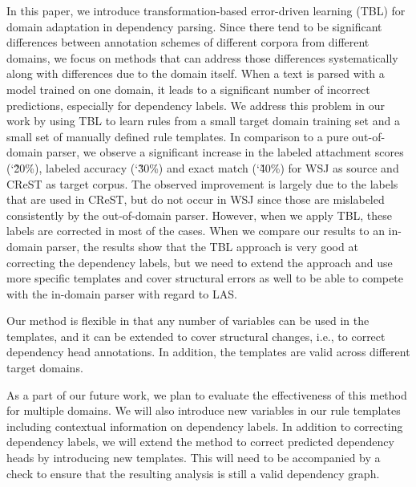 In this paper, we introduce transformation-based error-driven learning (TBL) for domain adaptation in dependency parsing. Since there tend to be significant differences between annotation schemes of different corpora from different domains, we focus on methods that can address those differences systematically along with differences due to the domain itself.  When a text is parsed with a model trained on one domain, it leads to a significant number of incorrect predictions, especially for dependency labels. %
We address this problem in our work by using TBL to learn rules from a small target domain training set and a small set of manually defined rule templates. %
In comparison to a pure out-of-domain parser, we observe a significant increase in the labeled attachment scores (\char`\~20\%), labeled accuracy (\char`\~30\%) and exact match (\char`\~40\%) for WSJ as source and CReST as target corpus. The observed improvement is largely due to the labels that are used in CReST, but do not occur in WSJ since those are mislabeled consistently by the out-of-domain parser. However, when we apply TBL, these labels are corrected in most of the cases. When we compare our results to an in-domain parser, the results show that the TBL approach is very
 good at correcting the dependency labels, but we need to extend the approach and use more specific templates and cover structural errors as well to be able to compete with the in-domain parser with regard to LAS. 

Our method is flexible in that any number of variables can be used in the templates, and it can be extended to cover structural changes, i.e., to correct dependency head annotations. In addition, the templates are valid across different target domains.

As a part of our future work, we plan to evaluate the effectiveness of this method for multiple domains. We will also introduce new variables in our rule templates including contextual information on dependency labels. In addition to correcting dependency labels, we will extend the method to correct predicted dependency heads by introducing new templates. This will need to be accompanied by a check to ensure that the resulting analysis is still a valid dependency graph. 
